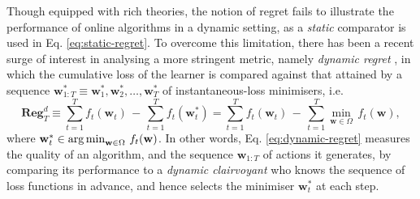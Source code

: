 Though equipped with rich theories, the notion of regret fails to illustrate the performance of online algorithms in a dynamic setting, as a \emph{static} comparator is used in Eq. \eqref{eq:static-regret}. To overcome this limitation, there has been a recent surge of interest in analysing a more stringent metric, namely \emph{dynamic regret} \citep{hall&willett13, hall&willett15, jadbabaie15, besbes15, mokhtari16, yang16, zhang17, gao18}, in which the cumulative loss of the learner is compared against that attained by a sequence $\mathbf{w}_{1:T}^* \equiv \mathbf{w}_1^*, \mathbf{w}_2^*, \ldots, \mathbf{w}_T^*$ of instantaneous-loss minimisers, i.e.\
\begin{equation}
\label{eq:dynamic-regret}
  \textbf{Reg}_T^d
  \equiv \sum_{t=1}^T f_t(\mathbf{w}_t) \, - \, \sum_{t=1}^T f_t(\mathbf{w}_t^*)
  = \sum_{t=1}^T f_t(\mathbf{w}_t) \, - \, \sum_{t=1}^T \min_{\mathbf{w} \in \Omega} \, f_t(\mathbf{w}),
\end{equation}
where $\mathbf{w}^*_t \in \operatorname*{arg\,min}_{\mathbf{w} \in \Omega} \, f_t(\mathbf{w})$.
In other words, Eq. \eqref{eq:dynamic-regret} measures the quality of an algorithm, and the sequence $\mathbf{w}_{1:T}$ of actions it generates, by comparing its performance to a \emph{dynamic clairvoyant} who knows the sequence of loss functions in advance, and hence selects the minimiser $\mathbf{w}_t^*$ at each step.

